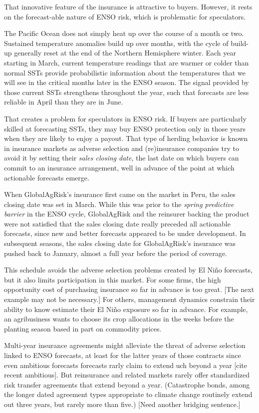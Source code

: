 \documentclass[authoryear]{article}
\begin{document}
\begin{itemize}
That innovative feature of the insurance is attractive to buyers. However, it rests on the forecast-able nature of ENSO risk, which is problematic for speculators. 

The Pacific Ocean does not simply heat up over the course of a month or two. Sustained temperature anomalies build up over months, with the cycle of build-up generally reset at the end of the Northern Hemisphere winter. Each year starting in March, current temperature readings that are warmer or colder than normal SSTs provide probabilistic information about the temperatures that we will see in the critical months later in the ENSO season. The signal provided by those current SSTs strengthens throughout the year, such that forecasts are less reliable in April than they are in June.

That creates a problem for speculators in ENSO risk. If buyers are particularly skilled at forecasting SSTs, they may buy ENSO protection only in those years when they are likely to enjoy a payout. That type of herding behavior is known in insurance markets as adverse selection and (re)insurance companies try to avoid it by setting their \emph{sales closing date}, the last date on which buyers can commit to an insurance arrangement, well in advance of the point at which actionable forecasts emerge. 

When GlobalAgRisk's insurance first came on the market in Peru, the sales closing date was set in March. While this was prior to the \emph{spring predictive barrier} in the ENSO cycle, GlobalAgRisk and the reinsurer backing the product were not satisfied that the sales closing date really preceded all actionable forecasts, since new and better forecasts appeared to be under development. In subsequent seasons, the sales closing date for GlobalAgRisk's insurance was pushed back to January, almost a full year before the period of coverage.

This schedule avoids the adverse selection problems created by El Ni\~no forecasts, but it also limits participation in this market. For some firms, the high opportunity cost of purchasing insurance so far in advance is too great. [The next example may not be necessary.] For others, management dynamics constrain their ability to know estimate their El Ni\~no exposure so far in advance. For example, an agribusiness wants to choose its crop allocations in the weeks before the planting season based in part on commodity prices.

Multi-year insurance agreements might alleviate the threat of adverse selection linked to ENSO forecasts, at least for the latter years of those contracts since even ambitious forecasts forecasts rarly claim to extend uch beyond a year [cite recent ambitious]. But reinsurance and related markets rarely offer standardized risk transfer agreements that extend beyond a year. (Catastrophe bonds, among the longer dated agreement types appropriate to climate change routinely extend out three years, but rarely more than five.) [Need another bridging sentence.] 


\end{itemize}
\end{document}
